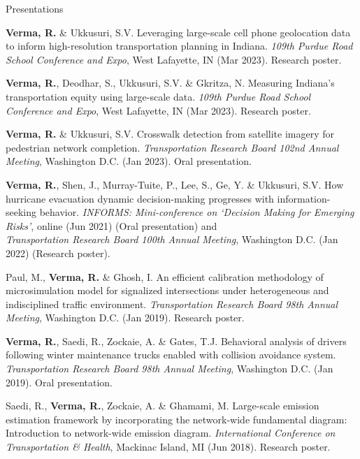 \documentclass{CV} %
\begin{document}
\begin{rSection}{Presentations}
\begin{etaremune}
        \item \textbf{Verma, R.} \& Ukkusuri, S.V. Leveraging large-scale cell phone geolocation data to inform high-resolution transportation planning in Indiana. \textit{109th Purdue Road School Conference and Expo}, West Lafayette, IN (Mar 2023). Research poster.

        \item \textbf{Verma, R.}, Deodhar, S., Ukkusuri, S.V. \& Gkritza, N. Measuring Indiana's transportation equity using large-scale data. \textit{109th Purdue Road School Conference and Expo}, West Lafayette, IN (Mar 2023). Research poster.

        \item \textbf{Verma, R.} \& Ukkusuri, S.V. Crosswalk detection from satellite imagery for pedestrian network completion. \textit{Transportation Research Board 102nd Annual Meeting}, Washington D.C. (Jan 2023). Oral presentation.

        \item \textbf{Verma, R.}, Shen, J., Murray-Tuite, P., Lee, S., Ge, Y. \& Ukkusuri, S.V. How hurricane evacuation dynamic decision-making progresses with information-seeking behavior. \textit{INFORMS: Mini-conference on `Decision Making for Emerging Risks'}, online (Jun 2021) (Oral presentation) and
        \\ \textit{Transportation Research Board 100th Annual Meeting}, Washington D.C. (Jan 2022) (Research poster).
    
        \item Paul, M., \textbf{Verma, R.} \& Ghosh, I. An efficient calibration methodology of microsimulation model for signalized intersections under heterogeneous and indisciplined traffic environment. \textit{Transportation Research Board 98th Annual Meeting}, Washington D.C. (Jan 2019). Research poster.
        
        \item \textbf{Verma, R.}, Saedi, R., Zockaie, A. \& Gates, T.J. Behavioral analysis of drivers following winter maintenance trucks enabled with collision avoidance system. \textit{Transportation Research Board 98th Annual Meeting}, Washington D.C. (Jan 2019). Oral presentation.

        \item Saedi, R., \textbf{Verma, R.}, Zockaie, A. \& Ghamami, M. Large-scale emission estimation framework by incorporating the network-wide fundamental diagram: Introduction to network-wide emission diagram. \textit{International Conference on Transportation \& Health}, Mackinac Island, MI (Jun 2018). Research poster.
    \end{etaremune}
\end{rSection}
\end{document}
